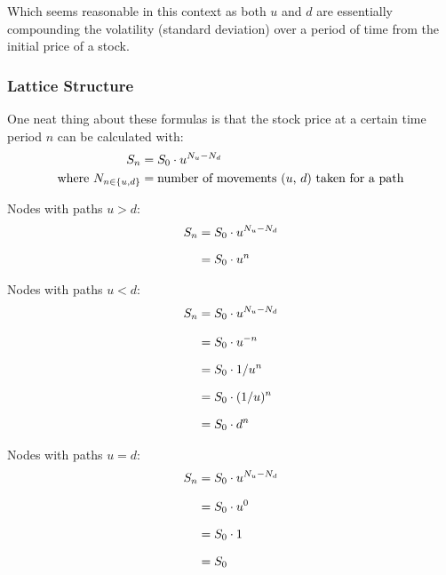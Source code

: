 \documentclass[12pt, letterpaper]{article}\usepackage{float}
\begin{document}
\noindent Which seems reasonable in this context as both ${u}$ and ${d}$ are essentially compounding the volatility (standard deviation) over a period of time from the initial price of a stock.

\bigskip

\subsubsection*{Lattice Structure}

One neat thing about these formulas is that the stock price at a certain time period ${n}$ can be calculated with:
\begin{align*}
  \centering
  S_n &= S_0 \cdot u^{N_u-N_d} \\
  \text{where}~N_{n \in \{u,d\}} &= \text{number of movements (${u}$, ${d}$) taken for a path}
\end{align*}

\bigskip

Nodes with paths ${u > d}$:
\begin{equation*}
  \setlength{\jot}{10pt}
  \begin{split}
    {S}_n
    & = {S}_0 \cdot {u}^{N_u-N_d} \\
    & = {S}_0 \cdot {u}^n
  \end{split}
\end{equation*}

\bigskip

Nodes with paths ${u < d}$:
\begin{equation*}
  \setlength{\jot}{10pt}
  \begin{split}
    {S}_n
    & = {S}_0 \cdot {u}^{N_u-N_d} \\
    & = {S}_0 \cdot {u^{-n}} \\
    & = {S}_0 \cdot {1/u^n} \\
    & = {S}_0 \cdot ({1/u})^n \\
    & = {S}_0 \cdot {d^n}
  \end{split}
\end{equation*}

\bigskip

Nodes with paths ${u = d}$:
\begin{equation*}
  \setlength{\jot}{10pt}
  \begin{split}
    {S}_n
    & = {S}_0 \cdot {u}^{N_u-N_d} \\
    & = {S}_0 \cdot {u^0} \\
    & = {S}_0 \cdot 1 \\
    & = {S}_0
  \end{split}
\end{equation*}
\end{document}
